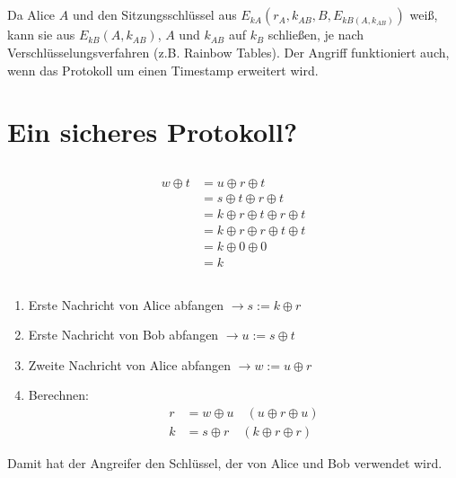\documentclass{../crypto}
\begin{document}
\subsection{}

Da Alice $A$ und den Sitzungsschlüssel aus $E_{kA}(r_A,k_{AB},B,E_{kB(A,k_{AB})})$
weiß, kann sie aus $E_{kB}(A,k_{AB})$, $A$ und $k_{AB}$ auf $k_B$ schließen, je
nach Verschlüsselungsverfahren (z.B. Rainbow Tables). Der
Angriff funktioniert auch, wenn das Protokoll um einen Timestamp erweitert wird.

\section{Ein sicheres Protokoll?}
\subsection{}
\begin{align*}
	w \oplus t & = u \oplus r \oplus t                   \\
	           & = s \oplus t \oplus r \oplus t          \\
	           & = k \oplus r \oplus t \oplus r \oplus t \\
	           & = k \oplus r \oplus r \oplus t \oplus t \\
	           & = k \oplus 0 \oplus 0                   \\
	           & = k
\end{align*}

\subsection{}
\begin{enumerate}
    \item Erste Nachricht von Alice abfangen $\rightarrow s := k \oplus r$
    \item Erste Nachricht von Bob abfangen $\rightarrow u := s \oplus t$
    \item Zweite Nachricht von Alice abfangen $\rightarrow w := u \oplus r$
    \item Berechnen: 
        \begin{align*}
           r & = w \oplus u \quad \left(u \oplus r \oplus u\right)\\
           k & = s \oplus r \quad \left(k \oplus r \oplus r\right)
        \end{align*}
\end{enumerate}
Damit hat der Angreifer den Schlüssel, der von Alice und Bob verwendet wird.
\end{document}
